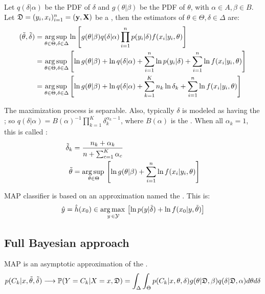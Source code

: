 Let $q(\delta|\alpha)$ be the PDF of $\delta$ and $g(\theta|\beta)$ be the PDF of $\theta$, with  $\alpha\in A, \beta\in B$. Let $\mathfrak{D}=(y_i,x_i)_{i=1}^n=(\vb{y},\vb{X})$ be a , then the  estimators of $\theta\in\Theta, \delta\in\Delta$ are:
\begin{align*}
    (\Tilde{\theta}, \Tilde{\delta}) 
    &= \operatorname*{arg\,sup\,}_{\theta\in\Theta, \delta\in\Delta} \ln\left[g(\theta|\beta)q(\delta|\alpha) \prod_{i=1}^np(y_i|\delta) f(x_i|y_i,\theta) \right]\\
    &= \operatorname*{arg\,sup\,}_{\theta\in\Theta, \delta\in\Delta} \left[\ln g(\theta|\beta)+\ln q(\delta|\alpha)+\sum_{i=1}^n\ln p(y_i|\delta)+\sum_{i=1}^n\ln f(x_i|y_i,\theta)\right]
    \\
    &= \operatorname*{arg\,sup\,}_{\theta\in\Theta, \delta\in\Delta} \left[\ln g(\theta|\beta)+\ln q(\delta|\alpha)+\sum_{k=1}^Kn_k\ln \delta_k+\sum_{i=1}^n\ln f(x_i|y_i,\theta)\right]
\end{align*}

The maximization process is separable. Also, typically $\delta$ is modeled as having the ; so $q(\delta|\alpha)=B(\alpha)^{-1}\prod_{k=1}^K \delta_k^{\alpha_k-1}$, where $B(\alpha)$ is the . When all $\alpha_k=1$, this is called :
\begin{align*}
    \Tilde{\delta}_k &= \frac{n_k+\alpha_k}{n+\sum_{c=1}^K\alpha_c} \\
    \Tilde{\theta} &= \operatorname*{arg\,sup\,}_{\theta\in\Theta} \left[\ln g(\theta|\beta)+\sum_{i=1}^n\ln f(x_i|y_i,\theta)\right]
\end{align*}

MAP classifier is based on an approximation named the . This is:
\begin{equation*}
    \hat{y}=\hat{h}(x_0) \in \operatorname*{arg\,max\,}_{y\,\in\mathcal{Y}}\left[ \ln p(y|\Tilde{\delta})+\ln f(x_0|y,\Tilde{\theta})\right]
\end{equation*}

\subsection{Full Bayesian approach}
MAP is an asymptotic approximation  of the . 
\begin{equation*}
   p(C_k|x,\Tilde{\theta},\Tilde{\delta}) \longrightarrow \operatorname{\mathbb{P}}(Y=C_k|X=x,\mathfrak{D}) = \int_{\Delta}\int_{\Theta}p(C_k|x,\theta,\delta)g(\theta|\mathfrak{D},\beta)q(\delta|\mathfrak{D},\alpha)d\theta d\delta
\end{equation*}


